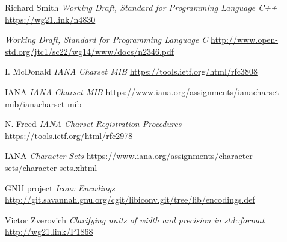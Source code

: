 \documentclass{wg21}
\begin{document}




\renewcommand{\section}[2]{}%

\begin{thebibliography}{9}

Richard Smith
\emph{Working Draft, Standard for Programming Language C++}\newline
\url{https://wg21.link/n4830}


\emph{Working Draft, Standard for Programming Language C}\newline
\url{ http://www.open-std.org/jtc1/sc22/wg14/www/docs/n2346.pdf}


I. McDonald
\emph{IANA Charset MIB}\newline
\url{https://tools.ietf.org/html/rfc3808}

IANA
\emph{IANA Charset MIB}\newline
\url{https://www.iana.org/assignments/ianacharset-mib/ianacharset-mib}


N. Freed
\emph{IANA Charset Registration Procedures}\newline
\url{https://tools.ietf.org/html/rfc2978}

IANA
\emph{Character Sets}\newline
\url{https://www.iana.org/assignments/character-sets/character-sets.xhtml}



GNU project
\emph{Iconv Encodings}\newline
\url{http://git.savannah.gnu.org/cgit/libiconv.git/tree/lib/encodings.def}

Victor Zverovich
\emph{Clarifying units of width and precision in std::format}\newline
\url{http://wg21.link/P1868}


\end{thebibliography}
\end{document}
